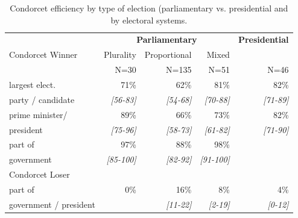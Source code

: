 \documentclass[12pt]{scrartcl}
\begin{document}
\begin{table}[ht]
\caption{Condorcet efficiency by type of election (parliamentary vs. presidential and by electoral systems.}
\centering
\begin{tabular}{l|rrr|r} \toprule 
   & \multicolumn{3}{c|}{\textbf{Parliamentary}} & \textbf{Presidential}\\
 Condorcet Winner& Plurality  & Proportional & Mixed &  \\
                &   N=30   & N=135   & N=51    & N=46 \\ \midrule 
largest elect.& 71\%     & 62\%   &   81\% &  82\%  \\
party / candidate & \emph{[56-83]} & \emph{[54-68]} & \emph{[70-88]} & \emph{[71-89]} \\ \midrule 
   prime minister/ &   89\% &  66\% &   73\% &   82\% \\
president & \emph{[75-96]} & \emph{[58-73]} & \emph{[61-82]} & \emph{[71-90]} \\ \midrule
part of &   97\% &  88\% &   98\% &    \\
government & \emph{[85-100]} & \emph{[82-92]} & \emph{[91-100]} & \\ \midrule
Condorcet Loser & & & & \\
part of & 0\%& 16\%& 8\% & 4\%\\
government / president &  & \emph{[11-22]} & \emph{[2-19]} & \emph{[0-12]} \\
\bottomrule 
\end{tabular}
\label{tb.efficiency}
\end{table}

\end{document}
